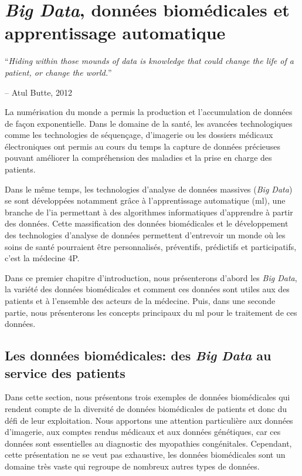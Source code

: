 \chapter{\textit{Big Data}, données biomédicales et apprentissage automatique}

\epigraph{\LARGE{``\textit{Hiding within those mounds of data is knowledge that could change the life of a patient, or change the world.}''}}{\LARGE{-- Atul Butte, 2012}}

La numérisation du monde a permis la production et l'accumulation de données de façon exponentielle. Dans le domaine de la santé, les avancées technologiques comme les technologies de séquençage, d'imagerie ou les dossiers médicaux électroniques ont permis au cours du temps la capture de données précieuses pouvant améliorer la compréhension des maladies et la prise en charge des patients.

Dans le même temps, les technologies d'analyse de données massives (\textit{Big Data}) se sont développées notamment grâce à l'apprentissage automatique (\gls{ml}), une branche de l'\gls{ia} permettant à des algorithmes informatiques d'apprendre à partir des données. Cette massification des données biomédicales et le développement des technologies d'analyse de données permettent d'entrevoir un monde où les soins de santé pourraient être personnalisés, préventifs, prédictifs et participatifs, c'est la médecine 4P.

Dans ce premier chapitre d'introduction, nous présenterons d'abord les \textit{Big Data}, la variété des données biomédicales et comment ces données sont utiles aux des patients et à l'ensemble des acteurs de la médecine. Puis, dans une seconde partie, nous présenterons les concepts principaux du \gls{ml} pour le traitement de ces données.

\section{Les données biomédicales: des \textit{Big Data} au service des patients}
Dans cette section, nous présentons trois exemples de données biomédicales qui rendent compte de la diversité de données biomédicales de patients et donc du défi de leur exploitation. Nous apportons une attention particulière aux données d'imagerie, aux comptes rendus médicaux et aux données génétiques, car ces données sont essentielles au diagnostic des myopathies congénitales.  Cependant, cette présentation ne se veut pas exhaustive, les données biomédicales sont un domaine très vaste qui regroupe de nombreux autres types de données.

